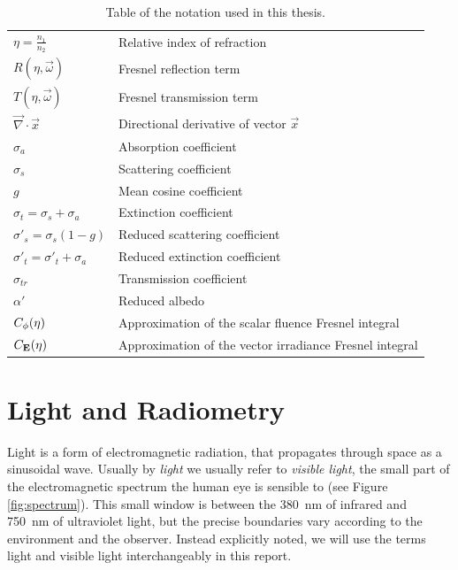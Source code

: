 \begin{table}[h]
\begin{tabular}{|l|l|}
$\eta = \frac{n_1}{n_2}$           & Relative index of refraction                            \\ %
$R(\eta,\vec{\omega})$             & Fresnel reflection term                                 \\ %
$T(\eta,\vec{\omega})$             & Fresnel transmission term                               \\ %
$\vec{\nabla} \cdot \vec{x}$       & Directional derivative of vector $\vec{x}$              \\ %
$\sigma_a$                         & Absorption coefficient                                  \\ %
$\sigma_s$                         & Scattering coefficient                                  \\ %
$g$                                & Mean cosine coefficient                                 \\ %
$\sigma_t = \sigma_s + \sigma_a$   & Extinction coefficient                                  \\ %
$\sigma'_s = \sigma_s (1-g)$       & Reduced scattering coefficient                          \\ %
$\sigma'_t = \sigma'_t + \sigma_a$ & Reduced extinction coefficient                          \\ %
$\sigma_{tr}$                      & Transmission coefficient                                \\ %
$\alpha'$                          & Reduced albedo                                          \\ %
$C_{\phi}(\eta)$                              & Approximation of the scalar fluence Fresnel integral    \\ %
$C_{\mathbf{E}}(\eta)$                              & Approximation of the vector irradiance Fresnel integral \\ \hline
\end{tabular}
\caption{Table of the notation used in this thesis.}
\end{table}
\FloatBarrier

\section{Light and Radiometry}
Light is a form of electromagnetic radiation, that propagates through space as a sinusoidal wave. Usually by \emph{light} we usually refer to \emph{visible light}, the small part of the electromagnetic spectrum the human eye is sensible to (see Figure \ref{fig:spectrum}). This small window is between the \SI{380}{\nano\meter} of infrared and \SI{750}{\nano\meter} of ultraviolet light, but the precise boundaries vary according to the environment and the observer. Instead explicitly noted, we will use the terms light and visible light interchangeably in this report.

